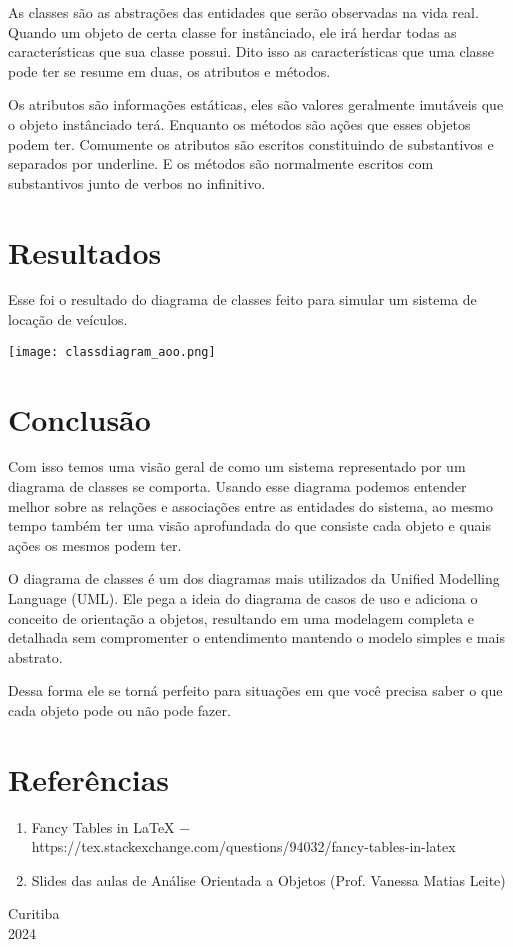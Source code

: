 \documentclass{report}
\begin{document}
As classes são as abstrações das entidades que serão observadas na vida real.
Quando um objeto de certa classe for instânciado, ele irá herdar todas as características
que sua classe possui. Dito isso as características que uma classe pode ter se resume em
duas, os atributos e métodos.

Os atributos são informações estáticas, eles são valores geralmente imutáveis que
o objeto instânciado terá. Enquanto os métodos são ações que esses objetos podem ter.
Comumente os atributos são escritos constituindo de substantivos e separados por underline.
E os métodos são normalmente escritos com substantivos junto de verbos no infinitivo.

\newpage
\thispagestyle{headings}
\indent
\section{Resultados}
Esse foi o resultado do diagrama de classes feito para simular um sistema de locação
de veículos.

\begin{center}
\texttt{[image: classdiagram\_aoo.png]}
\end{center}

\indent
\section{Conclusão}
Com isso temos uma visão geral de como um sistema representado por um diagrama de classes
se comporta. Usando esse diagrama podemos entender melhor
sobre as relações e associações entre as entidades do sistema, ao mesmo tempo 
também ter uma visão aprofundada do que consiste cada objeto e 
quais ações os mesmos podem ter.

O diagrama de classes é um dos diagramas mais utilizados da Unified Modelling Language (UML).
Ele pega a ideia do diagrama de casos de uso e adiciona o conceito de orientação a objetos,
resultando em uma modelagem completa e detalhada sem compromenter o entendimento mantendo
o modelo simples e mais abstrato. 

Dessa forma ele se torná perfeito para situações
em que você precisa saber o que cada objeto pode ou não pode fazer.

\newpage
\thispagestyle{headings}
\indent
\section{Referências}

\begin{enumerate}
    \item Fancy Tables in LaTeX $-$ https://tex.stackexchange.com/questions/94032/fancy-tables-in-latex
    \item Slides das aulas de Análise Orientada a Objetos (Prof. Vanessa Matias Leite)
\end{enumerate}

\vfill
\begin{center}
    Curitiba\\
    2024
\end{center}
\end{document}
